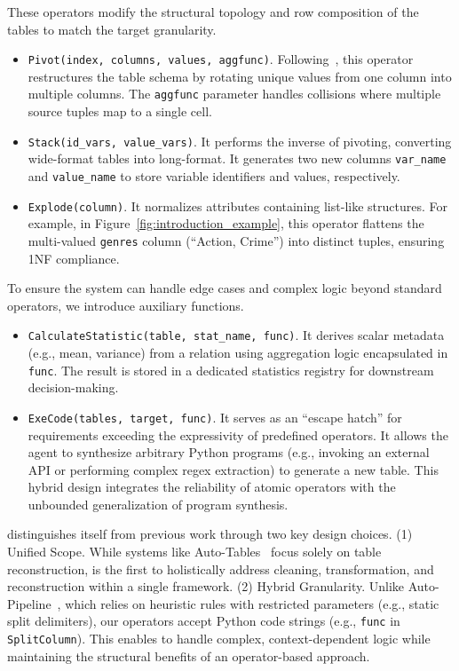  These operators modify the structural topology and row composition of the tables to match the target granularity.
\begin{itemize}[leftmargin=1em]
    \item \texttt{Pivot(index, columns, values, aggfunc)}. Following~\cite{DBLP:journals/pvldb/LiHYWC23}, this operator restructures the table schema by rotating unique values from one column into multiple columns. The \texttt{aggfunc} parameter handles collisions where multiple source tuples map to a single cell.
    \item \texttt{Stack(id\_vars, value\_vars)}. It performs the inverse of pivoting, converting wide-format tables into long-format. It generates two new columns \texttt{var\_name} and \texttt{value\_name} to store variable identifiers and values, respectively.
    \item \texttt{Explode(column)}. It normalizes attributes containing list-like structures. For example, in Figure~\ref{fig:introduction_example}, this operator flattens the multi-valued \texttt{genres} column (``Action, Crime'') into distinct tuples, ensuring 1NF compliance.
\end{itemize}


 To ensure the system can handle edge cases and complex logic beyond standard operators, we introduce auxiliary functions.
\begin{itemize}[leftmargin=1em]
    \item \texttt{CalculateStatistic(table, stat\_name, func)}. It derives scalar metadata (e.g., mean, variance) from a relation using aggregation logic encapsulated in \texttt{func}. The result is stored in a dedicated statistics registry for downstream decision-making.
    \item \texttt{ExeCode(tables, target, func)}. It serves as an ``escape hatch'' for requirements exceeding the expressivity of predefined operators. It allows the agent to synthesize arbitrary Python programs (e.g., invoking an external API or performing complex regex extraction) to generate a new table. This hybrid design integrates the reliability of atomic operators with the unbounded generalization of program synthesis.
\end{itemize}


\sys distinguishes itself from previous work through two key design choices.
(1) {Unified Scope.} While systems like Auto-Tables~\cite{DBLP:journals/pvldb/LiHYWC23} focus solely on table reconstruction, \sys is the first to holistically address cleaning, transformation, and reconstruction within a single framework.
(2) {Hybrid Granularity.} Unlike Auto-Pipeline~\cite{yang2021auto}, which relies on heuristic rules with restricted parameters (e.g., static split delimiters), our operators accept Python code strings (e.g., \texttt{func} in \texttt{SplitColumn}). This enables \sys to handle complex, context-dependent logic while maintaining the structural benefits of an operator-based approach.

